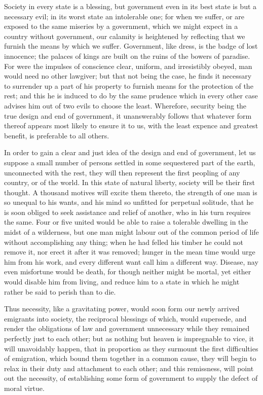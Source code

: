 \documentclass[12pt,oneside]{memoir}
\begin{document}
Society in every state is a blessing, but government even in its best state is but a necessary evil; in its worst state an intolerable one; for when we suffer, or are exposed to the same miseries by a government, which we might expect in a country without government, our calamity is heightened by reflecting that we furnish the means by which we suffer. Government, like dress, is the badge of lost innocence; the palaces of kings are built on the ruins of the bowers of paradise. For were the impulses of conscience clear, uniform, and irresistibly obeyed, man would need no other lawgiver; but that not being the case, he finds it necessary to surrender up a part of his property to furnish means for the protection of the rest; and this he is induced to do by the same prudence which in every other case advises him out of two evils to choose the least. Wherefore, security being the true design and end of government, it unanswerably follows that whatever form thereof appears most likely to ensure it to us, with the least expence and greatest benefit, is preferable to all others.

In order to gain a clear and just idea of the design and end of government, let us suppose a small number of persons settled in some sequestered part of the earth, unconnected with the rest, they will then represent the first peopling of any country, or of the world. In this state of natural liberty, society will be their first thought. A thousand motives will excite them thereto, the strength of one man is so unequal to his wants, and his mind so unfitted for perpetual solitude, that he is soon obliged to seek assistance and relief of another, who in his turn requires the same. Four or five united would be able to raise a tolerable dwelling in the midst of a wilderness, but one man might labour out of the common period of life without accomplishing any thing; when he had felled his timber he could not remove it, nor erect it after it was removed; hunger in the mean time would urge him from his work, and every different want call him a different way. Disease, nay even misfortune would be death, for though neither might be mortal, yet either would disable him from living, and reduce him to a state in which he might rather be said to perish than to die.

Thus necessity, like a gravitating power, would soon form our newly arrived emigrants into society, the reciprocal blessings of which, would supersede, and render the obligations of law and government unnecessary while they remained perfectly just to each other; but as nothing but heaven is impregnable to vice, it will unavoidably happen, that in proportion as they surmount the first difficulties of emigration, which bound them together in a common cause, they will begin to relax in their duty and attachment to each other; and this remissness, will point out the necessity, of establishing some form of government to supply the defect of moral virtue.
\end{document}
